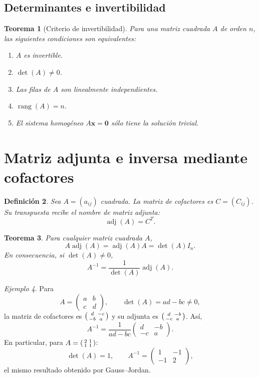 \documentclass[12pt]{article}
\newtheorem{definicion}{Definición}[section]
\newtheorem{teorema}[definicion]{Teorema}
\theoremstyle{remark}
\newtheorem{ejemplo}[definicion]{Ejemplo}
\newcommand{\rang}{\operatorname{rang}}
\newcommand{\adj}{\operatorname{adj}}
\newcommand{\vect}[1]{\boldsymbol{#1}}
\begin{document}
\subsection*{Determinantes e invertibilidad}
\begin{teorema}[Criterio de invertibilidad]
Para una matriz cuadrada $A$ de orden $n$, las siguientes condiciones son equivalentes:
\begin{enumerate}
\item $A$ es invertible.
\item $\det(A)\ne0$.
\item Las filas de $A$ son linealmente independientes.
\item $\rang(A)=n$.
\item El sistema homogéneo $A\vect{x}=\vect{0}$ sólo tiene la solución trivial.
\end{enumerate}
\end{teorema}

\section{Matriz adjunta e inversa mediante cofactores}
\begin{definicion}
Sea $A=(a_{ij})$ cuadrada. La \emph{matriz de cofactores} es $C=(C_{ij})$. Su transpuesta recibe el nombre de \emph{matriz adjunta}:
\[
\boxed{\adj(A)=C^T.}
\]
\end{definicion}

\begin{teorema}
Para cualquier matriz cuadrada $A$,
\[
A\adj(A)=\adj(A)A=\det(A)I_n.
\]
En consecuencia, si $\det(A)\ne0$,
\[
\boxed{A^{-1}=\frac{1}{\det(A)}\adj(A).}
\]
\end{teorema}

\begin{ejemplo}
Para
\[
A=\begin{pmatrix}a&b\\c&d\end{pmatrix},\qquad \det(A)=ad-bc\ne0,
\]
la matriz de cofactores es $\begin{psmallmatrix}d&-c\\-b&a\end{psmallmatrix}$ y su adjunta es $\begin{psmallmatrix}d&-b\\-c&a\end{psmallmatrix}$. Así,
\[
\boxed{A^{-1}=\frac{1}{ad-bc}\begin{pmatrix}d&-b\\-c&a\end{pmatrix}.}
\]
En particular, para $A=\begin{psmallmatrix}2&1\\1&1\end{psmallmatrix}$:
\[
\det(A)=1,\qquad A^{-1}=\begin{pmatrix}1&-1\\-1&2\end{pmatrix},
\]
el mismo resultado obtenido por Gauss--Jordan.
\end{ejemplo}
\end{document}
